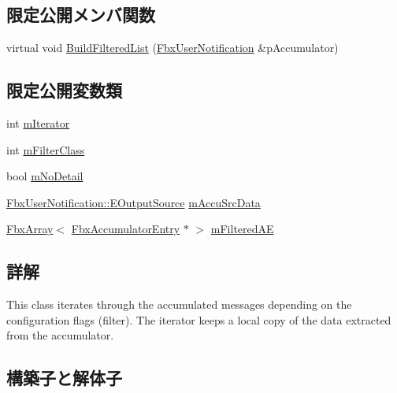 \subsection*{限定公開メンバ関数}
\begin{DoxyCompactItemize}
\item 
virtual void \hyperlink{class_fbx_user_notification_filtered_iterator_ab4aeac096dc929ed94aebe72506524ef}{Build\+Filtered\+List} (\hyperlink{class_fbx_user_notification}{Fbx\+User\+Notification} \&p\+Accumulator)
\end{DoxyCompactItemize}
\subsection*{限定公開変数類}
\begin{DoxyCompactItemize}
\item 
int \hyperlink{class_fbx_user_notification_filtered_iterator_a00fa9fbeceeddef4d6622bc95c9941b9}{m\+Iterator}
\item 
int \hyperlink{class_fbx_user_notification_filtered_iterator_ab0e224a4d178349530d2157753139d63}{m\+Filter\+Class}
\item 
bool \hyperlink{class_fbx_user_notification_filtered_iterator_ab38143eb6742f98d8462fdb83b9f6616}{m\+No\+Detail}
\item 
\hyperlink{class_fbx_user_notification_a45290aa788e47fce1d7b8a88687aa184}{Fbx\+User\+Notification\+::\+E\+Output\+Source} \hyperlink{class_fbx_user_notification_filtered_iterator_a817f4766f2b7475c68fb596388eed438}{m\+Accu\+Src\+Data}
\item 
\hyperlink{class_fbx_array}{Fbx\+Array}$<$ \hyperlink{class_fbx_accumulator_entry}{Fbx\+Accumulator\+Entry} $\ast$ $>$ \hyperlink{class_fbx_user_notification_filtered_iterator_a1f1ac151c2005704078362ed3a588399}{m\+Filtered\+AE}
\end{DoxyCompactItemize}


\subsection{詳解}
This class iterates through the accumulated messages depending on the configuration flags (filter). The iterator keeps a local copy of the data extracted from the accumulator. 

\subsection{構築子と解体子}
\mbox{\label{class_fbx_user_notification_filtered_iterator_a6e10f51f22b5d4e32fb4acfc4492091f}} 
